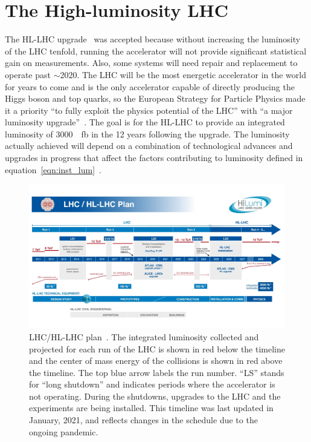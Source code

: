 \section{The High-luminosity LHC}

The HL-LHC upgrade~\cite{hl_lhc_tdr} was accepted because without increasing the luminosity of the LHC tenfold, running the accelerator will not provide significant statistical gain on measurements. Also, some systems will need repair and replacement to operate past $\sim$2020. The LHC will be the most energetic accelerator in the world for years to come and is the only accelerator capable of directly producing the Higgs boson and top quarks, so the European Strategy for Particle Physics made it a priority ``to fully exploit the physics potential of the LHC'' with ``a major luminosity upgrade''~\cite{european_strategy_for_particle_physics}. The goal is for the HL-LHC to provide an integrated luminosity of \SI{3000}{\per\femto\barn} in the 12 years following the upgrade. The luminosity actually achieved will depend on a combination of technological advances and upgrades in progress that affect the factors contributing to luminosity defined in equation~\ref{eqn:inst_lum}~\cite{hl_lhc_tdr}.

\begin{figure}
    \centering
    \includegraphics[width = \textwidth]{figures/HL-LHC-updated-January-2021_small.jpg}
    \caption{LHC/HL-LHC plan~\cite{hl-lhc_plan_picture_website}. The integrated luminosity collected and projected for each run of the LHC is shown in red below the timeline and the center of mass energy of the collisions is shown in red above the timeline. The top blue arrow labels the run number. ``LS'' stands for ``long shutdown'' and indicates periods where the accelerator is not operating. During the shutdowns, upgrades to the LHC and the experiments are being installed. This timeline was last updated in January, 2021, and reflects changes in the schedule due to the ongoing pandemic. }
    \label{fig:hl-lhc}
\end{figure}

